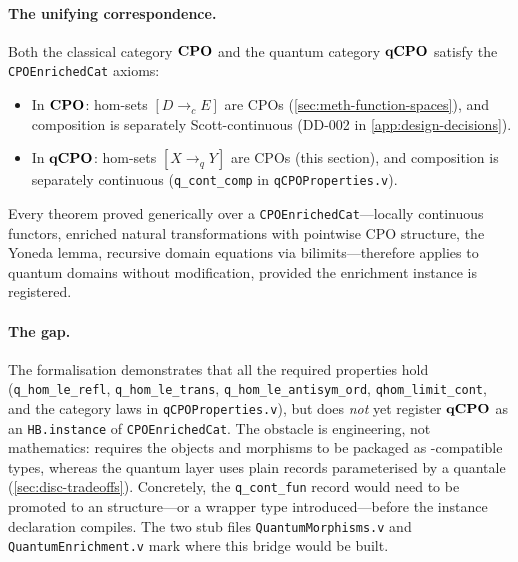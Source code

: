 \paragraph{The unifying correspondence.}
Both the classical category $\mathbf{CPO}$ and the quantum category $\mathbf{qCPO}$
satisfy the \texttt{CPOEnrichedCat} axioms:
\begin{itemize}
  \item In $\mathbf{CPO}$: hom-sets $[D \to_c E]$ are CPOs
    (\cref{sec:meth-function-spaces}), and composition is separately
    Scott-continuous (DD-002 in \cref{app:design-decisions}).
  \item In $\mathbf{qCPO}$: hom-sets $[X \to_q Y]$ are CPOs (this section),
    and composition is separately continuous
    (\texttt{q\_cont\_comp} in \texttt{qCPOProperties.v}).
\end{itemize}
Every theorem proved generically over a \texttt{CPOEnrichedCat}---locally continuous functors, enriched natural transformations with
pointwise CPO structure, the Yoneda lemma, recursive domain equations
via bilimits---therefore applies to quantum domains without
modification, provided the enrichment instance is registered.

\paragraph{The gap.}
The formalisation demonstrates that all the required properties
hold (\texttt{q\_hom\_le\_refl}, \texttt{q\_hom\_le\_trans},
\texttt{q\_hom\_le\_antisym\_ord}, \texttt{qhom\_limit\_cont},
and the category laws in \texttt{qCPOProperties.v}), but does
\emph{not} yet register $\mathbf{qCPO}$ as an \texttt{HB.instance} of
\texttt{CPOEnrichedCat}.
The obstacle is engineering, not mathematics: \HB{} requires the
objects and morphisms to be packaged as \HB{}-compatible types,
whereas the quantum layer uses plain records parameterised by a
quantale (\cref{sec:disc-tradeoffs}).
Concretely, the \texttt{q\_cont\_fun} record would need to be
promoted to an \HB{} structure---or a wrapper type
introduced---before the instance declaration compiles.
The two stub files \texttt{QuantumMorphisms.v} and
\texttt{QuantumEnrichment.v} mark where this bridge would be
built.

